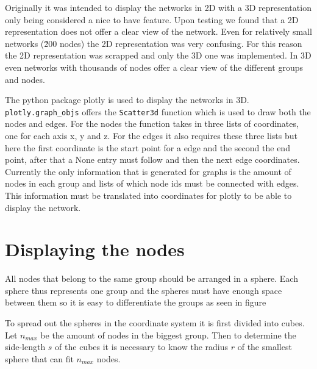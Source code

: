 Originally it was intended to display the networks in 2D with a 3D representation only being considered a nice to have feature. Upon testing we found that a 2D representation does not offer a clear view of the network. Even for relatively small networks (\~200 nodes) the 2D representation was very confusing. For this reason the 2D representation was scrapped and only the 3D one was implemented. In 3D even networks with thousands of nodes offer a clear view of the different groups and nodes.
\newline

The python package plotly \cite{plotly} is used to display the networks in 3D. \texttt{plotly.graph\_objs} offers the \texttt{Scatter3d} function which is used to draw both the nodes and edges. For the nodes the function takes in three lists of coordinates, one for each axis x, y and z. For the edges it also requires these three lists but here the first coordinate is the start point for a edge and the second the end point, after that a None entry must follow and then the next edge coordinates. Currently the only information that is generated for graphs is the amount of nodes in each group and lists of which node ids must be connected with edges. This information must be translated into coordinates for plotly to be able to display the network.

\section{Displaying the nodes}
\label{sub:displayNodes}
All nodes that belong to the same group should be arranged in a sphere. Each sphere thus represents one group and the spheres must have enough space between them so it is easy to differentiate the groups as seen in figure %

To spread out the spheres in the coordinate system it is first divided into cubes. Let $n_{max}$ be the amount of nodes in the biggest group. Then to determine the side-length $s$ of the cubes it is necessary to know the radius $r$ of the smallest sphere that can fit $n_{max}$ nodes.


